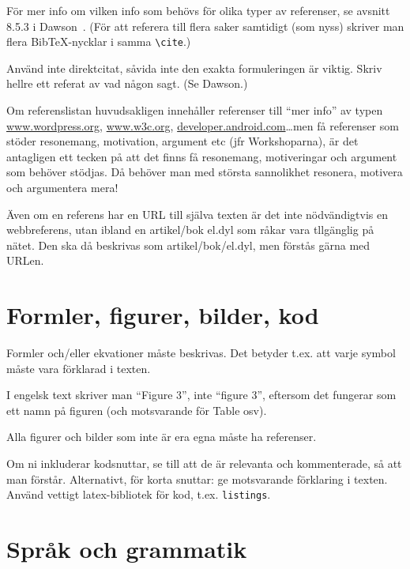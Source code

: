 \documentclass[swedish, a4paper,12pt]{article}
\begin{document}
För mer info om vilken info som behövs för olika typer av referenser, se avsnitt 8.5.3 i Dawson~\cite{dawson:projects-in-computing,dawson:projects-in-computing-old}. (För att referera till flera saker samtidigt (som nyss) skriver man flera BibTeX-nycklar i samma \verb|\cite|.)

Använd inte direktcitat, såvida inte den exakta formuleringen är viktig.  Skriv hellre ett referat av vad någon sagt. (Se Dawson.)

Om referenslistan huvudsakligen innehåller referenser till ``mer info'' av typen
\url{www.wordpress.org}, \url{www.w3c.org}, \url{developer.android.com}\ldots men få referenser som stöder resonemang, motivation, argument etc (jfr Workshoparna), är det antagligen ett tecken på att det finns få resonemang, motiveringar och argument som behöver stödjas. Då behöver man med största sannolikhet resonera, motivera och argumentera mera!

Även om en referens har en URL till själva texten är det inte nödvändigtvis en webbreferens, utan ibland en artikel/bok el.dyl som råkar vara tllgänglig på nätet. Den ska då beskrivas som artikel/bok/el.dyl, men förstås gärna med URLen.

\section{Formler, figurer, bilder, kod}
\label{sec:forml-figur-bild}

Formler och/eller ekvationer måste beskrivas.  Det betyder t.ex. att varje symbol måste vara förklarad i texten.

I engelsk text skriver man ``Figure 3'', inte ``figure 3'', eftersom det fungerar som ett namn på figuren (och motsvarande för Table osv).

Alla figurer och bilder som inte är era egna måste ha referenser.

Om ni inkluderar kodsnuttar, se till att de är relevanta och kommenterade, så att man förstår.  Alternativt, för korta snuttar: ge motsvarande förklaring i texten.
Använd vettigt latex-bibliotek för kod, t.ex. \texttt{listings}.

\section{Språk och grammatik}
\label{sec:sprak-och-grammatik}
\end{document}

